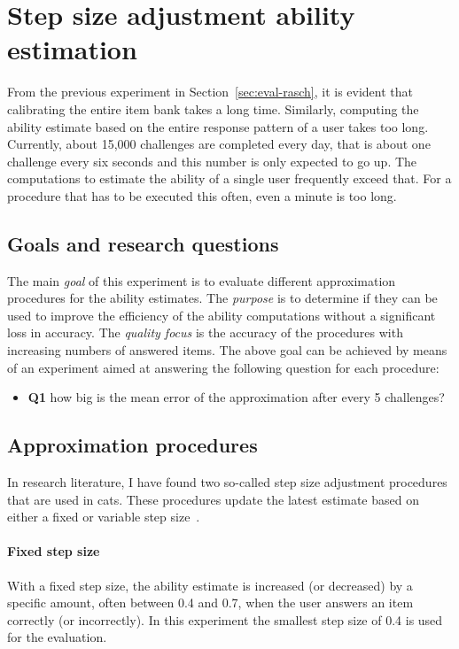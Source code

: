 \section{Step size adjustment ability estimation}
\label{sec:eval-stepsize}

From the previous experiment in Section~\ref{sec:eval-rasch}, it is evident that calibrating the entire item bank takes a long time.
Similarly, computing the ability estimate based on the entire response pattern of a user takes too long.
Currently, about 15,000 challenges are completed every day, that is about one challenge every six seconds and this number is only expected to go up.
The computations to estimate the ability of a single user frequently exceed that.
For a procedure that has to be executed this often, even a minute is too long.

\subsection{Goals and research questions}
The main \textit{goal} of this experiment is to evaluate different approximation procedures for the ability estimates.
The \textit{purpose} is to determine if they can be used to improve the efficiency of the ability computations without a significant loss in accuracy.
The \textit{quality focus} is the accuracy of the procedures with increasing numbers of answered items.
The above goal can be achieved by means of an experiment aimed at answering the following question for each procedure:
\begin{itemize}
    \item \textbf{Q1} how big is the mean error of the approximation after every 5 challenges?
\end{itemize}

\subsection{Approximation procedures}
In research literature, I have found two so-called step size adjustment procedures that are used in \glspl{cat}.
These procedures update the latest estimate based on either a fixed or variable step size~\cite{dodd1995computerized}.

\paragraph{Fixed step size} With a fixed step size, the ability estimate is increased (or decreased) by a specific amount, often between 0.4 and 0.7, when the user answers an item correctly (or incorrectly).
In this experiment the smallest step size of 0.4 is used for the evaluation.

